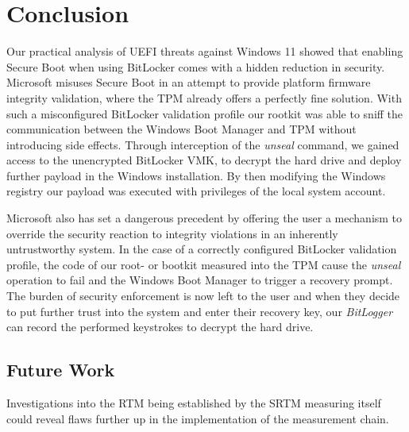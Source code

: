 
\chapter{Conclusion}
\label{sec:conclusion}

Our practical analysis of \ac{UEFI} threats against Windows 11 showed that enabling Secure Boot when using BitLocker comes with a hidden reduction in security.
Microsoft misuses Secure Boot in an attempt to provide platform firmware integrity validation, where the \ac{TPM} already offers a perfectly fine solution.
With such a misconfigured BitLocker validation profile our rootkit was able to sniff the communication between the Windows Boot Manager and \ac{TPM} without introducing side effects.
Through interception of the \emph{unseal} command, we gained access to the unencrypted BitLocker \ac{VMK}, to decrypt the hard drive and deploy further payload in the Windows installation.
By then modifying the Windows registry our payload was executed with privileges of the local system account.

Microsoft also has set a dangerous precedent by offering the user a mechanism to override the security reaction to integrity violations in an inherently untrustworthy system.
In the case of a correctly configured BitLocker validation profile, the code of our root- or bootkit measured into the \ac{TPM} cause the \emph{unseal} operation to fail and the Windows Boot Manager to trigger a recovery prompt.
The burden of security enforcement is now left to the user and when they decide to put further trust into the system and enter their recovery key, our \emph{BitLogger} can record the performed keystrokes to decrypt the hard drive.

\section*{Future Work}

Investigations into the \ac{RTM} being established by the \ac{SRTM} measuring itself could reveal flaws further up in the implementation of the measurement chain.